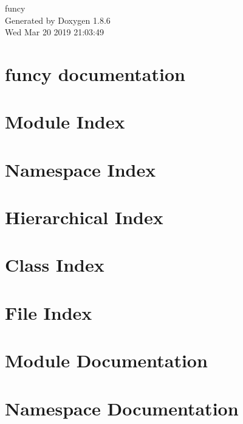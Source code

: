 \documentclass[twoside]{book}
\newcommand{\clearemptydoublepage}{%
  \newpage{\pagestyle{empty}\cleardoublepage}%
}
\begin{document}
\hypersetup{pageanchor=false}
\begin{titlepage}
\vspace*{7cm}
\begin{center}%
{\Large funcy }\\
\vspace*{1cm}
{\large Generated by Doxygen 1.8.6}\\
\vspace*{0.5cm}
{\small Wed Mar 20 2019 21:03:49}\\
\end{center}
\end{titlepage}
\clearemptydoublepage
\tableofcontents
\clearemptydoublepage
{}
\hypersetup{pageanchor=true}

\chapter{funcy documentation}
\label{index}\hypertarget{index}{}
\chapter{Module Index}

\chapter{Namespace Index}

\chapter{Hierarchical Index}

\chapter{Class Index}

\chapter{File Index}

\chapter{Module Documentation}










\chapter{Namespace Documentation}












\end{document}
